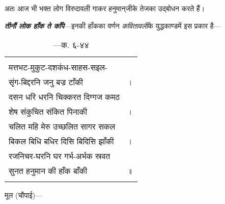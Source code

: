 \begin{sloppypar}\justifying{}
\noindent अतः आज भी भक्त लोग विरुदावली गाकर हनुमान्‌जीके तेजका उद्बोधन करते हैं।
\end{sloppypar}
\begin{sloppypar}\justifying{}
\textbf{\textit{तीनौं लोक हाँक ते काँपे}}—इनकी हाँकका वर्णन \textit{कवितावली}के युद्धकाण्डमें इस प्रकार है—
\end{sloppypar}
{\bfseries
\setlength{\mylenone}{0pt}
\settowidth{\mylentwo}{मत्तभट-मुकुट-दशकंध-साहस-सइल-}
\setlength{\mylenone}{\maxof{\mylenone}{\mylentwo}}
\settowidth{\mylentwo}{सृंग-बिद्दरनि जनु बज्र टाँकी}
\setlength{\mylenone}{\maxof{\mylenone}{\mylentwo}}
\settowidth{\mylentwo}{दसन धरि धरनि चिक्करत दिग्गज कमठ}
\setlength{\mylenone}{\maxof{\mylenone}{\mylentwo}}
\settowidth{\mylentwo}{शेष संकुचित संकित पिनाकी}
\setlength{\mylenone}{\maxof{\mylenone}{\mylentwo}}
\settowidth{\mylentwo}{चलित महि मेरु उच्छलित सागर सकल}
\setlength{\mylenone}{\maxof{\mylenone}{\mylentwo}}
\settowidth{\mylentwo}{बिकल बिधि बधिर दिसि बिदिसि झाँकी}
\setlength{\mylenone}{\maxof{\mylenone}{\mylentwo}}
\settowidth{\mylentwo}{रजनिचर-घरनि घर गर्भ-अर्भक स्रवत}
\setlength{\mylenone}{\maxof{\mylenone}{\mylentwo}}
\settowidth{\mylentwo}{सुनत हनुमान की हाँक बाँकी}
\setlength{\mylenone}{\maxof{\mylenone}{\mylentwo}}
\setlength{\mylentwo}{\baselineskip}
\setlength{\mylenone}{\mylenone + 1pt}
\begin{longtable}[l]{@{\hspace*{\mylen}}>{\setlength\parfillskip{0pt}}p{\mylenone}@{}@{}l@{}}
 & \\[-\the\mylentwo]
मत्तभट-मुकुट-दशकंध-साहस-सइल- & \\ \nopagebreak
सृंग-बिद्दरनि जनु बज्र टाँकी & ।\\
दसन धरि धरनि चिक्करत दिग्गज कमठ & \\ \nopagebreak
शेष संकुचित संकित पिनाकी & ।\\
चलित महि मेरु उच्छलित सागर सकल & \\ \nopagebreak
बिकल बिधि बधिर दिसि बिदिसि झाँकी & ।\\
रजनिचर-घरनि घर गर्भ-अर्भक स्रवत & \\ \nopagebreak
सुनत हनुमान की हाँक बाँकी & ॥\\ \nopagebreak
\caption*{—क. ६-४४}
\end{longtable}
}
\paraseplotus
\pagebreak


{}
\begin{sloppypar}\justifying{}
मूल (चौपाई)—
\end{sloppypar}

